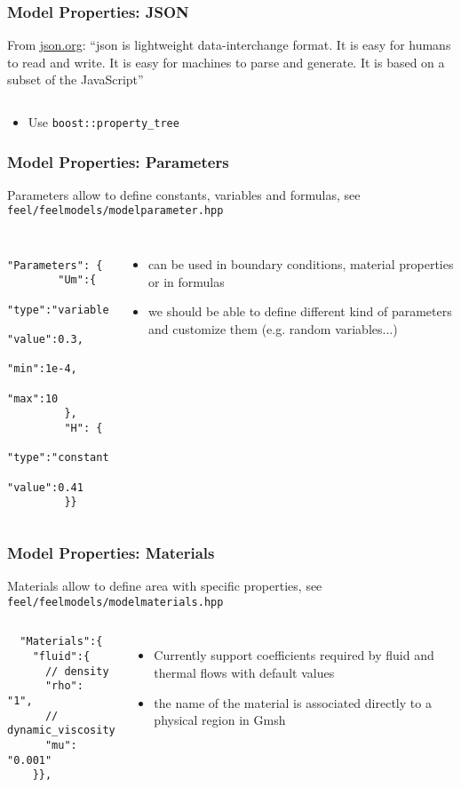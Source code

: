 \begin{frame}[fragile]
  \frametitle{Model Properties: JSON}
  From \url{json.org}: ``json is lightweight data-interchange format. It
  is easy for humans to read and write. It is easy for machines to
  parse and generate. It is based on a subset of the JavaScript''

  \inputminted{json}{Codes/prudhomme/fud4/turek.feelpp}
  \begin{itemize}
  \item Use \texttt{boost::property_tree}
  \end{itemize}
\end{frame}

\begin{frame}[fragile]
  \frametitle{Model Properties: Parameters}
  Parameters allow to define constants, variables and formulas, see \texttt{feel/feelmodels/modelparameter.hpp}
  \begin{columns}[c]
    \begin{verbatim}
      "Parameters": {
        "Um":{
           "type":"variable",
           "value":0.3,
           "min":1e-4,
           "max":10
         },
         "H": {
           "type":"constant",
           "value":0.41
         }}
    \end{verbatim}
    \begin{itemize}
    \item can be used in boundary conditions, material properties or
      in formulas
    \item we should be able to define different kind of parameters and
      customize them (e.g. random variables...)
    \end{itemize}
  \end{columns}
\end{frame}

\begin{frame}[fragile]
  \frametitle{Model Properties: Materials}
  Materials allow to define area with specific properties, see \texttt{feel/feelmodels/modelmaterials.hpp}
  \begin{columns}[c]
    \begin{verbatim}
  "Materials":{
    "fluid":{
      // density
      "rho": "1",
      // dynamic_viscosity
      "mu": "0.001"
    }},
\end{verbatim}
    \begin{itemize}
    \item Currently support coefficients required by fluid and thermal
      flows with default values
    \item the name of the material is associated directly to a
      physical region in Gmsh
    \end{itemize}
  \end{columns}
\end{frame}

